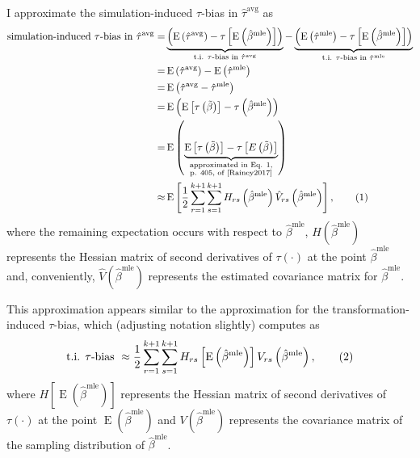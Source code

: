 \documentclass[12pt]{article}
\newcommand\numberthis{\addtocounter{equation}{1}\tag{\theequation}}
\DeclareMathOperator*{\E}{\text{E}}
\begin{document}
I approximate the simulation-induced $\tau$-bias in $\hat{\tau}^\text{avg}$ as
\begin{align*}
\text{simulation-induced $\tau$-bias in } \hat{\tau}^\text{avg} =& \underbrace{\left( \E\left( \hat{\tau}^\text{avg}\right) - \tau \left[\E\left( \hat{\beta}^\text{mle} \right) \right] \right) }_{\text{t.i. } \tau\text{-bias in }\hat{\tau}^{\text{avg}}} - \underbrace{ \left( \E\left( \hat{\tau}^\text{mle}\right) -  \tau \left[\E\left( \hat{\beta}^\text{mle} \right) \right] \right)}_{\text{t.i. } \tau\text{-bias in }\hat{\tau}^{\text{mle}}}\\
=& \E\left( \hat{\tau}^\text{avg}\right) - \E\left( \hat{\tau}^\text{mle}\right)\\
=& \E\left( \hat{\tau}^\text{avg} - \hat{\tau}^\text{mle} \right)\\
=& \E\left(     \E\left[ \tau\left( \tilde{\beta} \right) \right]      -      \tau \left( \hat{\beta}^\text{mle} \right)     \right)\\
=& \E\left(     \underbrace{\E\left[ \tau\left( \tilde{\beta} \right) \right]      -      \tau \left[ E\left(  \tilde{\beta} \right)\right]}_{\substack{\text{approximated in Eq. 1,} \\ \text{p. 405, of \cite{Rainey2017}}}}   \right)\\
\approx & \E\left[ \dfrac{1}{2} \displaystyle \sum_{r = 1}^{k+1} \sum_{s = 1}^{k+1} H_{rs}\left( \hat{\beta}^\text{mle} \right) \hat{V}_{rs} \left( \hat{\beta}^{\text{mle}} \right) \right], \numberthis \label{eqn:avg-approx}
\end{align*}
where the remaining expectation occurs with respect to $\hat{\beta}^\text{mle}$, $H\left( \hat{\beta}^\text{mle} \right)$ represents the Hessian matrix of second derivatives of $\tau(\cdot)$ at the point $\hat{\beta}^\text{mle}$ and, conveniently, $\hat{V} \left( \hat{\beta}^{\text{mle}} \right)$ represents the estimated covariance matrix for $\hat{\beta}^\text{mle}$.

This approximation appears similar to the approximation for the transformation-induced $\tau$-bias, which (adjusting notation slightly) \citet[p. 405, Eq. 1]{Rainey2017} computes as
\begin{align*}
\text{t.i. } \tau \text{-bias } \approx \dfrac{1}{2} \displaystyle \sum_{r = 1}^{k+1} \sum_{s = 1}^{k+1} H_{rs}\left[ \E\left( \hat{\beta}^\text{mle} \right) \right] V_{rs} \left( \hat{\beta}^{\text{mle}} \right), \numberthis \label{eqn:mle-approx}
\end{align*}
where $H\left[ \E\left( \hat{\beta}^\text{mle} \right) \right]$ represents the Hessian matrix of second derivatives of $\tau(\cdot)$ at the point $\E\left( \hat{\beta}^\text{mle} \right)$ and $V \left( \hat{\beta}^{\text{mle}} \right)$ represents the covariance matrix of the sampling distribution of $\hat{\beta}^\text{mle}$.
\end{document}
